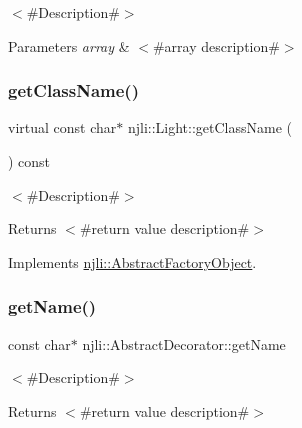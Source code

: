 $<$\#\+Description\#$>$


\begin{DoxyParams}{Parameters}
{\em array} & $<$\#array description\#$>$ \\
\hline
\end{DoxyParams}
\mbox{\label{classnjli_1_1_light_a36c0c113950ee57a28d1daa9e004f1bc}} 
\subsubsection{\texorpdfstring{get\+Class\+Name()}{getClassName()}}
{\footnotesize\ttfamily virtual const char$\ast$ njli\+::\+Light\+::get\+Class\+Name (\begin{DoxyParamCaption}{ }\end{DoxyParamCaption}) const\hspace{0.3cm}{\ttfamily [virtual]}}

$<$\#\+Description\#$>$

\begin{DoxyReturn}{Returns}
$<$\#return value description\#$>$ 
\end{DoxyReturn}


Implements \mbox{\hyperlink{classnjli_1_1_abstract_factory_object_af4151e41b80d5bc3fc42822c67fc2278}{njli\+::\+Abstract\+Factory\+Object}}.

\mbox{\label{classnjli_1_1_light_ad41266885be835f3ee602311e20877a4}} 
\subsubsection{\texorpdfstring{get\+Name()}{getName()}}
{\footnotesize\ttfamily const char$\ast$ njli\+::\+Abstract\+Decorator\+::get\+Name}

$<$\#\+Description\#$>$

\begin{DoxyReturn}{Returns}
$<$\#return value description\#$>$ 
\end{DoxyReturn}
\mbox{\label{classnjli_1_1_light_ac4ca71716ed832be357f15f8262c8448}} 
